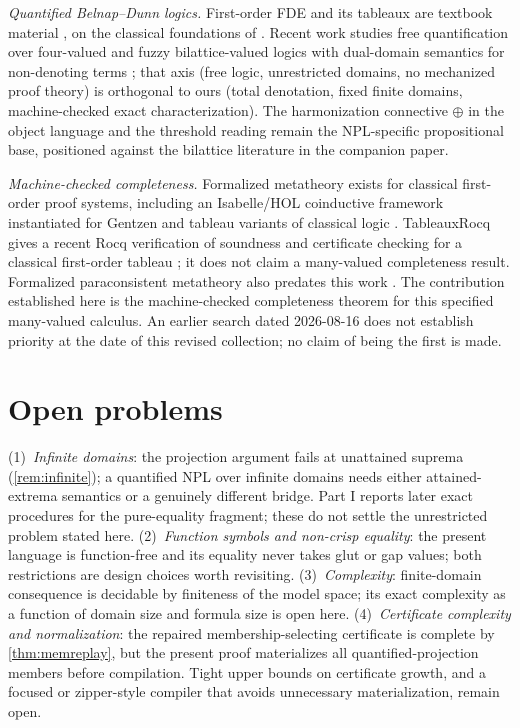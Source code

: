 \documentclass[11pt,a4paper]{article}
\theoremstyle{definition}
\newcommand{\hmz}{\oplus}
\begin{document}
\emph{Quantified Belnap--Dunn logics.} First-order FDE and its tableaux
are textbook material \cite[Ch.~22]{priest2008introduction}, on the classical
foundations of \cite{belnap1977useful,dunn1976intuitive}. Recent work
studies free quantification over four-valued and fuzzy bilattice-valued
logics with dual-domain semantics for non-denoting terms
\cite{behounek2023free}; that axis (free logic, unrestricted domains, no
mechanized proof theory) is orthogonal to ours (total denotation, fixed
finite domains, machine-checked exact characterization). The
harmonization connective $\hmz$ in the object language and the threshold
reading remain the NPL-specific propositional base, positioned against
the bilattice literature in the companion paper.

\emph{Machine-checked completeness.} Formalized metatheory exists for
classical first-order proof systems, including an Isabelle/HOL coinductive
framework instantiated for Gentzen and tableau variants of classical logic
\cite{blanchette2017soundness}. TableauxRocq gives a recent Rocq verification
of soundness and certificate checking for a classical first-order tableau
\cite{rosain2026tableauxrocq}; it does not claim a many-valued completeness
result. Formalized paraconsistent metatheory also predates this work
\cite{villadsen2017formalizing}. The contribution established here is the
machine-checked completeness theorem for this specified many-valued calculus.
An earlier search dated 2026-08-16 does not establish priority at the date of
this revised collection; no claim of being the first is made.

\section{Open problems}\label{sec:open}

(1)~\emph{Infinite domains}: the projection argument fails at unattained
suprema (\cref{rem:infinite}); a quantified NPL over infinite domains
needs either attained-extrema semantics or a genuinely different bridge.
Part I reports later exact procedures for the pure-equality fragment;
these do not settle the unrestricted problem stated here.
(2)~\emph{Function symbols and non-crisp equality}: the present language
is function-free and its equality never takes glut or gap values; both
restrictions are design choices worth revisiting.
(3)~\emph{Complexity}: finite-domain consequence is decidable by
finiteness of the model space; its exact complexity as a function of
domain size and formula size is open here.
(4)~\emph{Certificate complexity and normalization}: the repaired
membership-selecting certificate is complete by \cref{thm:memreplay}, but
the present proof materializes all quantified-projection members before
compilation.  Tight upper bounds on certificate growth, and a focused or
zipper-style compiler that avoids unnecessary materialization, remain
open.
\end{document}
